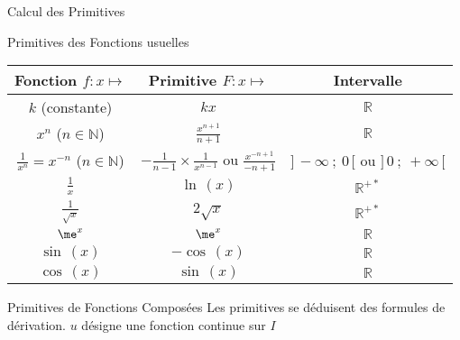 \documentclass{cours}
\begin{document}
    \begin{Gpartie}{Calcul des Primitives} 
        \begin{Spartie}{Primitives des Fonctions usuelles} 
            \begin{table}[H] \centering {}
                \begin{tabular}[c]{ @{}*{3}{C}@{} } \toprule
                    Fonction $f:x\mapsto$                       & Primitive $F:x\mapsto$                                            & Intervalle  \\ \midrule
                    $k$ (constante)                             & $kx$                                                              & $\mathbb{R}$ \\ 
                    $x^n$ ($n\in\mathbb{N}$)                    & $\frac{x^{n+1}}{n+1}$                                             & $\mathbb{R}$ \\ 
                    $\frac{1}{x^n}=x^{-n}$ ($n\in\mathbb{N}$)   & $-\frac{1}{n-1}\times\frac{1}{x^{n-1}}$ ou $\frac{x^{-n+1}}{-n+1}$& $\big]\,-\infty~;~0\,\big[$ ou $\big]\,0~;~+\infty\,\big[$ \\ 
                    $\frac{1}{x}$                               & $\ln\,(x)$                                                          & $\mathbb{R^{+*}}$ \\ 
                    $\frac{1}{\sqrt{x}}$                        & $2\sqrt{x}$                                                       & $\mathbb{R^{+*}}$ \\ 
                    $\me^x$                                       & $\me^x$                                                             & $\mathbb{R}$ \\ 
                    $\sin\,(x)$                                   & $-\cos\,(x)$                                                        & $\mathbb{R}$ \\ 
                    $\cos\,(x)$                                   & $\sin\,(x)$                                                         & $\mathbb{R}$ \\ \bottomrule
                \end{tabular}
            \end{table}
        \end{Spartie}
        \begin{Spartie}{Primitives de Fonctions Composées}
            Les primitives se déduisent des formules de dérivation. $u$ désigne une fonction continue sur $I$ \vspace{2ex}

\end{Spartie}
\end{Gpartie}
\end{document}
